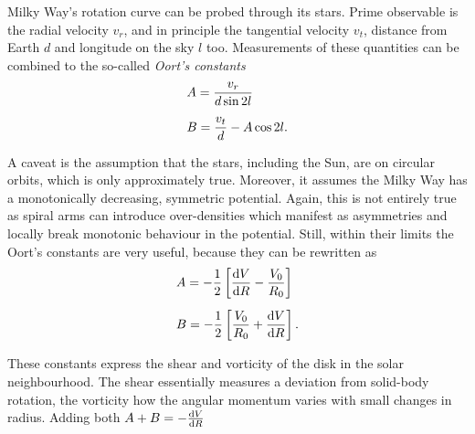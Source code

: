 Milky Way's rotation curve can be probed through its stars. Prime observable is
the radial velocity $v_{r}$, and in principle the tangential velocity $v_{t}$,
distance from Earth $d$ and longitude on the sky $l$ too.  Measurements of these
quantities can be combined to the so-called \textit{Oort's constants}
\begin{align}
    &A = \frac{v_{r}}{d\sin{2l}} \hspace{0.5cm}\nonumber\\[5pt]%
    &B = \frac{v_{t}}{d} - A\cos{2l}.
    \eqlbl{obs_oortsC}
\end{align}

A caveat is the assumption that the stars, including the Sun, are on circular
orbits, which is only approximately true.  Moreover, it assumes the Milky Way
has a monotonically decreasing, symmetric potential.  Again, this is not
entirely true as spiral arms can introduce over-densities which manifest as
asymmetries and locally break monotonic behaviour in the potential.  Still,
within their limits the Oort's constants are very useful, because they can be
rewritten as
\begin{align}
    &A = -\frac{1}{2} \left[\frac{\derivd V}{\derivd R} - \frac{V_{0}}{R_{0}}\right]\nonumber\\[5pt]%
    &B = -\frac{1}{2}\left[\frac{V_{0}}{R_{0}} + \frac{\derivd V}{\derivd R}\right].
    \eqlbl{oortsC}
\end{align}

These constants express the shear and vorticity of the disk in the solar
neighbourhood.  The shear essentially measures a deviation from solid-body
rotation, the vorticity how the angular momentum varies with small changes in
radius.  Adding both $A+B = -\frac{\mathrm{d} V}{\mathrm{d} R}$